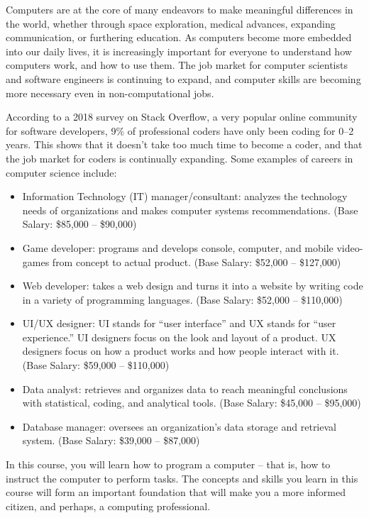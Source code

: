 Computers are at the core of many endeavors to make meaningful differences in the world, whether through space exploration, medical advances, expanding communication, or furthering education. As computers become more embedded into our daily lives, it is increasingly important for everyone to understand how computers work, and how to use them. The job market for computer scientists and software engineers is continuing to expand, and computer skills are becoming more necessary even in non-computational jobs.

According to a 2018 survey on Stack Overflow, a very popular online community for software developers, 9\% of professional coders have only been coding for 0--2 years. This shows that it doesn't take too much time to become a coder, and that the job market for coders is continually expanding. Some examples of careers in computer science include:

\begin{itemize}
\item Information Technology (IT) manager/consultant: analyzes the technology needs of organizations and makes computer systems recommendations. (Base Salary: \$85,000 -- \$90,000)
\item Game developer: programs and develops console, computer, and mobile video-games from concept to actual product. (Base Salary: \$52,000 -- \$127,000)
\item Web developer: takes a web design and turns it into a website by writing code in a variety of programming languages. (Base Salary: \$52,000 -- \$110,000)
\item UI/UX designer: UI stands for ``user interface'' and UX stands for ``user experience.'' UI designers focus on the look and layout of a product. UX designers focus on how a product works and how people interact with it. (Base Salary: \$59,000 -- \$110,000)
\item Data analyst: retrieves and organizes data to reach meaningful conclusions with statistical, coding, and analytical tools. (Base Salary: \$45,000 -- \$95,000)
\item Database manager: oversees an organization's data storage and retrieval system. (Base Salary: \$39,000 -- \$87,000)
\end{itemize}
In this course, you will learn how to program a computer -- that is, how to instruct the computer to perform tasks. The concepts and skills you learn in this course will form an important foundation that will make you a more informed citizen, and perhaps, a computing professional. 

